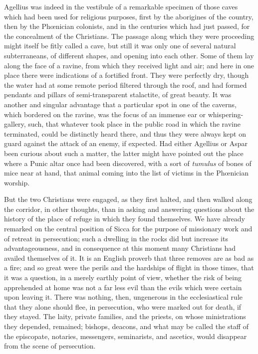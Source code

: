 Agellius was indeed in the vestibule of a remarkable specimen
of those caves which had been used for religious purposes, first by
the aborigines of the country, then by the Phœnician colonists, and
in the centuries which had just passed, for the concealment of the
Christians. The passage along which they were proceeding might itself
be fitly called a cave, but still it was only one of several natural
subterraneans, of different shapes, and opening into each other. Some
of them lay along the face of a ravine, from which they received light
and air; and here in one place there were indications of a fortified
front. They were perfectly dry, though the water had at some remote
period filtered through the roof, and had formed pendants and pillars
of semi-transparent stalactite, of great beauty. It was another and
singular advantage that a particular spot in one of the caverns, which
bordered on the ravine, was the focus of an immense ear or
whispering-gallery, such, that whatever took place in the public road
in which the ravine terminated, could be distinctly heard there, and
thus they were always kept on guard against the attack of an enemy, if
expected. Had either Agellius or Aspar been curious about such a
matter, the latter might have pointed out the place where a Punic
altar once had been discovered, with a sort of \emph{tumulus} of bones
of mice near at hand, that animal coming into the list of victims in
the Phœnician worship.

But the two Christians were engaged, as they first halted, and then
walked along the corridor, in other thoughts, than in asking and
answering questions about the history of the place of refuge in
which they found themselves. We have already remarked on the central
position of Sicca for the purpose of missionary work and of retreat in
persecution; such a dwelling in the rocks did but increase its
advantageousness, and in consequence at this moment many Christians
had availed themselves of it. It is an English proverb that three
removes are as bad as a fire; and so great were the perils and the
hardships of flight in those times, that it was a question, in a
merely earthly point of view, whether the risk of being apprehended at
home was not a far less evil than the evils which were certain upon
leaving it. There was nothing, then, ungenerous in the ecclesiastical
rule that they alone should flee, in persecution, who were marked out
for death, if they stayed. The laity, private families, and the
priests, on whose ministrations they depended, remained; bishops,
deacons, and what may be called the staff of the episcopate, notaries,
messengers, seminarists, and ascetics, would disappear from the scene
of persecution.

